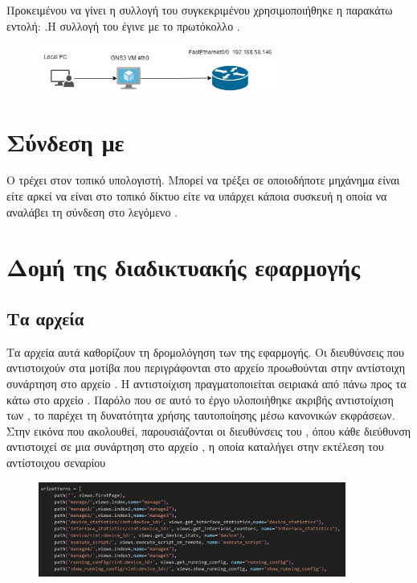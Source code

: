 Προκειμένου να γίνει η συλλογή του συγκεκριμένου  χρησιμοποιήθηκε η παρακάτω εντολή:
.Η συλλογή του  έγινε με το πρωτόκολλο .


\begin{figure}[h]
	\centering
	\includegraphics[width=0.7\textwidth]{graphics/jason1.png}
	\caption{ }
\end{figure}

\FloatBarrier

\section{Σύνδεση με  }

Ο  τρέχει στον τοπικό υπολογιστή. Μπορεί να τρέξει σε οποιοδήποτε
μηχάνημα είναι  είτε  αρκεί να είναι στο τοπικό δίκτυο
είτε να υπάρχει κάποια συσκευή  η οποία να αναλάβει τη σύνδεση στο λεγόμενο
.


\section{Δομή της διαδικτυακής εφαρμογής  }


\subsection{Τα αρχεία }
Τα αρχεία αυτά καθορίζουν τη δρομολόγηση των  της εφαρμογής. 
Οι διευθύνσεις  που αντιστοιχούν στα μοτίβα που περιγράφονται στο αρχείο  
προωθούνται στην αντίστοιχη συνάρτηση στο αρχείο . 
Η αντιστοίχιση πραγματοποιείται σειριακά από πάνω προς τα κάτω στο αρχείο . 
Παρόλο που σε αυτό το έργο υλοποιήθηκε ακριβής αντιστοίχιση των , το  παρέχει τη 
δυνατότητα χρήσης ταυτοποίησης μέσω κανονικών εκφράσεων. Στην εικόνα που ακολουθεί, παρουσιάζονται οι 
διευθύνσεις  του , όπου κάθε διεύθυνση αντιστοιχεί σε μια συνάρτηση στο αρχείο , 
η οποία καταλήγει στην εκτέλεση του αντίστοιχου σεναρίου

\begin{figure}[htb]
	\centering
	\includegraphics[width=0.9\textwidth]{graphics/urlpy.png}
	\caption{ }
\end{figure}

